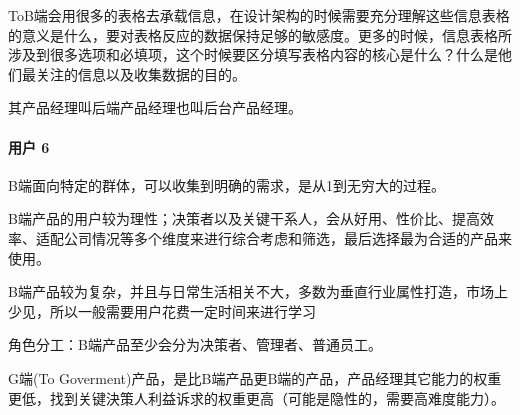 \documentclass[letterpaper,11pt,english]{sphinxmanual}
\begin{document}
ToB端会用很多的表格去承载信息，在设计架构的时候需要充分理解这些信息表格的意义是什么，要对表格反应的数据保持足够的敏感度。更多的时候，信息表格所涉及到很多选项和必填项，这个时候要区分填写表格内容的核心是什么？什么是他们最关注的信息以及收集数据的目的。
%
\begin{footnote}[42]\sphinxAtStartFootnote
{}
%
\end{footnote}

其产品经理叫后端产品经理也叫后台产品经理。%
\begin{footnote}[43]\sphinxAtStartFootnote
{}
%
\end{footnote}


\paragraph{用户 6\sphinxfootnotemark[44]}
\label{\detokenize{chapter_introduction/2B:id2}}%
\begin{footnotetext}[44]\sphinxAtStartFootnote
{}
%
\end{footnotetext}\ignorespaces 
B端面向特定的群体，可以收集到明确的需求，是从1到无穷大的过程。
%
\begin{footnote}[45]\sphinxAtStartFootnote
{}
%
\end{footnote}

B端产品的用户较为理性；决策者以及关键干系人，会从好用、性价比、提高效率、适配公司情况等多个维度来进行综合考虑和筛选，最后选择最为合适的产品来使用。

B端产品较为复杂，并且与日常生活相关不大，多数为垂直行业属性打造，市场上少见，所以一般需要用户花费一定时间来进行学习

角色分工：B端产品至少会分为决策者、管理者、普通员工。

G端(To
Goverment)产品，是比B端产品更B端的产品，产品经理其它能力的权重更低，找到关键決策人利益诉求的权重更高（可能是隐性的，需要高难度能力）。%
\begin{footnote}[46]\sphinxAtStartFootnote
{}
%
\end{footnote}
\end{document}
